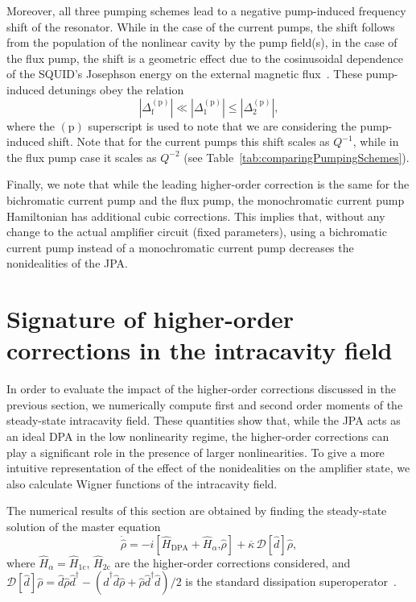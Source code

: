 \documentclass[pra,twocolumn,superscriptaddress]{revtex4-1}
\newcommand{\dhat}[0]{\hat{d}}
\newcommand{\Dsp}[0]{\Delta_{\mathrm{1}}}
\newcommand{\corrSinglePump}[0]{\hat{H}_{\mathrm{1c}}}
\newcommand{\Ddp}[0]{\Delta_{\mathrm{2}}}
\newcommand{\corrDoublePump}[0]{\hat{H}_{\mathrm{2c}}}
\newcommand{\Dfp}[0]{\Delta_{\mathrm{f}}}
\newcommand{\kappaTot}[0]{\overline{\kappa}}
\newcommand{\abs}[1]{\left|#1\right|}
\newcommand{\comm}[2]{\left[#1 \textrm{,} #2 \right]}
\begin{document}
Moreover, all three pumping schemes lead to a negative pump-induced frequency shift of the resonator. While in the case of the current pumps, the shift follows from the population of the nonlinear cavity by the pump field(s), in the case of the flux pump, the shift is a geometric effect due to the cosinusoidal dependence of the SQUID's Josephson energy on the external magnetic flux~\cite{Wustmann:2013uq,Krantz:2013vn}. 
These pump-induced detunings obey the relation 
\begin{equation}
	\abs{\Dfp^{(\mathrm{p})}} 
		\ll 
	\abs{\Dsp^{(\mathrm{p})}}
		\leq 
	\abs{\Ddp^{(\mathrm{p})}}
	, 
\end{equation}
where the $(\mathrm{p})$ superscript is used to note that we are considering the pump-induced shift.
Note that for the current pumps this shift scales as $Q^{-1}$, while in the flux pump case it scales as $Q^{-2}$ (see Table~\ref{tab:comparingPumpingSchemes}). 


Finally, we note that while the leading higher-order correction is the same for the bichromatic current pump and the flux pump, the monochromatic current pump Hamiltonian has additional cubic corrections. This implies that, without any change to the actual amplifier circuit (fixed parameters), using a bichromatic current pump  instead of a monochromatic current pump decreases the nonidealities of the JPA.

			
\section{Signature of higher-order corrections in the intracavity field}
\label{sec::intracavitySignatures}
In order to evaluate the impact of the higher-order corrections discussed in the previous section, we numerically compute first and second order moments of the steady-state intracavity field.
% 
These quantities show that, while the JPA acts as an ideal DPA in the low nonlinearity regime, the higher-order corrections can play a significant role in the presence of larger nonlinearities.
% 
To give a more intuitive representation of the effect of the nonidealities on the amplifier state, we also calculate Wigner functions of the intracavity field.

The numerical results of this section are obtained by finding the steady-state solution of the master equation
\begin{equation}
	\dot {\hat \rho}  = -i \comm{\hat H_{\mathrm{DPA}} + \hat H_\alpha}{\hat \rho} + \kappaTot\, \mathcal{D} [\dhat]\hat \rho,
	\label{eq:ME}
\end{equation}
where $\hat H_\alpha = \corrSinglePump$, $\corrDoublePump$ are the higher-order corrections considered, and $\mathcal{D} [\dhat] \hat\rho = \dhat \hat\rho \dhat^\dag - (\dhat^\dag \dhat \hat \rho + \hat\rho \dhat^\dag \dhat)/2$ is the standard dissipation superoperator~\cite{Gardiner:2004fk,Walls:2008fk}.
\end{document}
